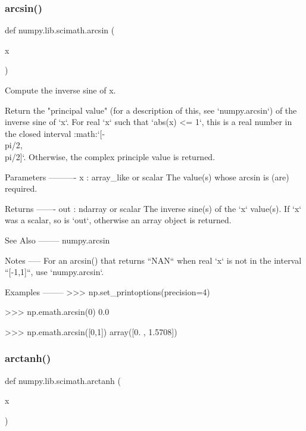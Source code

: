 \subsubsection{\texorpdfstring{arcsin()}{arcsin()}}
{\footnotesize\ttfamily def numpy.\+lib.\+scimath.\+arcsin (\begin{DoxyParamCaption}\item[{}]{x }\end{DoxyParamCaption})}

\begin{DoxyVerb}Compute the inverse sine of x.

Return the "principal value" (for a description of this, see
`numpy.arcsin`) of the inverse sine of `x`. For real `x` such that
`abs(x) <= 1`, this is a real number in the closed interval
:math:`[-\\pi/2, \\pi/2]`.  Otherwise, the complex principle value is
returned.

Parameters
----------
x : array_like or scalar
   The value(s) whose arcsin is (are) required.

Returns
-------
out : ndarray or scalar
   The inverse sine(s) of the `x` value(s). If `x` was a scalar, so
   is `out`, otherwise an array object is returned.

See Also
--------
numpy.arcsin

Notes
-----
For an arcsin() that returns ``NAN`` when real `x` is not in the
interval ``[-1,1]``, use `numpy.arcsin`.

Examples
--------
>>> np.set_printoptions(precision=4)

>>> np.emath.arcsin(0)
0.0

>>> np.emath.arcsin([0,1])
array([0.    , 1.5708])\end{DoxyVerb}
 \mbox{\label{namespacenumpy_1_1lib_1_1scimath_aebdc2055e5745021f61f1827e86a26ef}} 
\subsubsection{\texorpdfstring{arctanh()}{arctanh()}}
{\footnotesize\ttfamily def numpy.\+lib.\+scimath.\+arctanh (\begin{DoxyParamCaption}\item[{}]{x }\end{DoxyParamCaption})}

